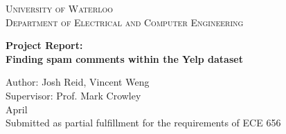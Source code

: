 \documentclass[12pt]{article}
\begin{document}
\begin{titlepage}
	\begin{center}
		{\hphantom{M}}
		\vspace{1cm}
		{\scshape\Huge{University of Waterloo}}\\
		\vspace{2cm}
		{\scshape\Large Department of Electrical and Computer Engineering}\\
		\vspace{1.5cm}
		\begin{spacing}{2.5}
		{\LARGE\bfseries Project Report:\\ Finding spam comments within the Yelp dataset}\\
		\end{spacing}
		\vspace{2cm}
		{\Large{Author: Josh Reid, Vincent Weng \vspace{1em} \\ Supervisor: Prof. Mark Crowley}}
		\vspace{1cm}\\
		{\Large April}\\
		\vspace{6em}
		{\Large Submitted as partial fulfillment for the requirements of ECE 656}
	\end{center}
\end{titlepage}
\end{document}
